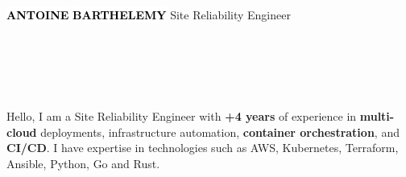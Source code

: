 \documentclass[10pt]{developercv}
\begin{document}
\begin{minipage}[t]{0.50\textwidth}
	\vspace{-\baselineskip}
	\vspace{10pt}
	\colorbox{white}{{\HUGE\textcolor{black}{\textbf{\MakeUppercase{Antoine}}}}}
	\colorbox{white}{{\HUGE\textcolor{black}{\textbf{\MakeUppercase{Barthelemy}}}}}
	\vspace{6pt}
	{\huge Site Reliability Engineer}
\end{minipage}
\begin{minipage}[t]{0.28\textwidth}
	\vspace{-\baselineskip}
	\vspace{9pt}
	\\
	\\
	\\
	\\
\end{minipage}
\begin{minipage}[t]{0.275\textwidth}
	\vspace{-\baselineskip}
	\hspace{0.1cm}
\end{minipage}

\vspace{-10pt}


\hspace{0pt}\begin{minipage}[t]{1.00\textwidth}
	\vspace{-\baselineskip}
	{Hello, I am a Site Reliability Engineer with \textbf{+4 years} of experience in \textbf{multi-cloud} deployments, infrastructure automation, \textbf{container orchestration}, and \textbf{CI/CD}. I have expertise in technologies such as AWS, Kubernetes, Terraform, Ansible, Python, Go and Rust.} %
\end{minipage}
\hfill

\end{document}
